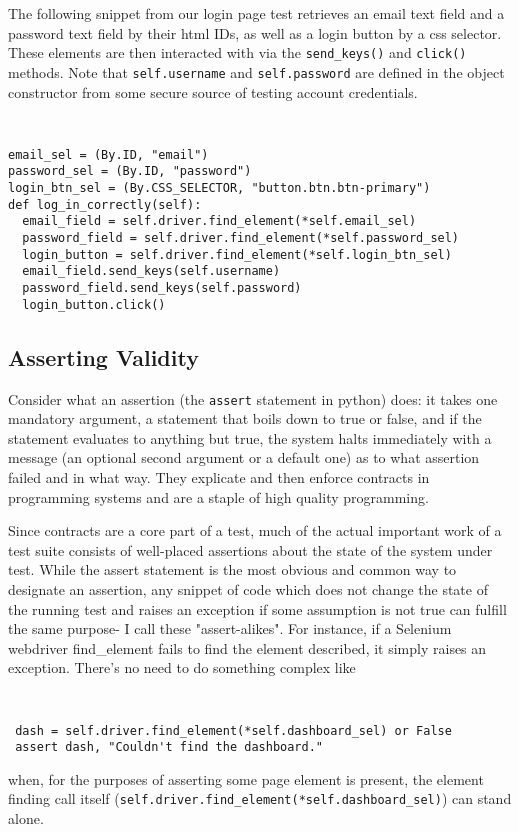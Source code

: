 The following snippet from our login page test retrieves an email text field and a password text field by their html IDs, as well as a login button by a css selector. These elements are then interacted with via the \texttt{send\_keys()} and \texttt{click()} methods. Note that \texttt{self.username} and \texttt{self.password} are defined in the object constructor from some secure source of testing account credentials.

{\tt
\begin{verbatim}
email_sel = (By.ID, "email")
password_sel = (By.ID, "password")
login_btn_sel = (By.CSS_SELECTOR, "button.btn.btn-primary")
def log_in_correctly(self):
  email_field = self.driver.find_element(*self.email_sel)
  password_field = self.driver.find_element(*self.password_sel)
  login_button = self.driver.find_element(*self.login_btn_sel)
  email_field.send_keys(self.username)
  password_field.send_keys(self.password)
  login_button.click()
\end{verbatim}
}

\subsection{Asserting Validity}
Consider what an assertion (the \texttt{assert} statement in python) does: it takes one mandatory argument, a statement that boils down to true or false, and if the statement evaluates to anything but true, the system halts immediately with a message (an optional second argument or a default one) as to what assertion failed and in what way. They explicate and then enforce contracts in programming systems and are a staple of high quality programming.

Since contracts are a core part of a test, much of the actual important work of a test suite consists of well-placed assertions about the state of the system under test. While the assert statement is the most obvious and common way to designate an assertion, any snippet of code which does not change the state of the running test and raises an exception if some assumption is not true can fulfill the same purpose- I call these "assert-alikes". For instance, if a Selenium webdriver find\_element fails to find the element described, it simply raises an exception. There's no need to do something complex like
{\tt
\begin{verbatim}
 dash = self.driver.find_element(*self.dashboard_sel) or False
 assert dash, "Couldn't find the dashboard."
\end{verbatim}
}
when, for the purposes of asserting some page element is present, the element finding call itself (\texttt{self.driver.find\_element(*self.dashboard\_sel)}) can stand alone.

